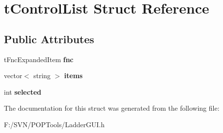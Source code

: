 \hypertarget{structt_control_list}{\section{t\-Control\-List Struct Reference}
\label{structt_control_list}
}
\subsection*{Public Attributes}
\begin{DoxyCompactItemize}
\item 
\hypertarget{structt_control_list_a0a474e5e979109230fd929693e900a5f}{t\-Fnc\-Expanded\-Item {\bfseries fnc}}\label{structt_control_list_a0a474e5e979109230fd929693e900a5f}

\item 
\hypertarget{structt_control_list_adacc0d1e65e0c534f850320422e4b75d}{vector$<$ string $>$ {\bfseries items}}\label{structt_control_list_adacc0d1e65e0c534f850320422e4b75d}

\item 
\hypertarget{structt_control_list_ae9d8f2170294e773f29b3062c609a718}{int {\bfseries selected}}\label{structt_control_list_ae9d8f2170294e773f29b3062c609a718}

\end{DoxyCompactItemize}


The documentation for this struct was generated from the following file\-:\begin{DoxyCompactItemize}
\item 
F\-:/\-S\-V\-N/\-P\-O\-P\-Tools/Ladder\-G\-U\-I.\-h\end{DoxyCompactItemize}
